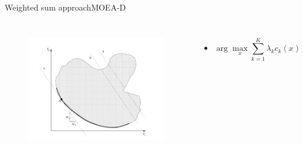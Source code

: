 \begin{frame}{Weighted sum approach}{MOEA-D}
	\begin{columns}
		\begin{figure}
			\centering
			\includegraphics[width=\linewidth]{figure/weighted_sum}
			\label{fig:weighted_sum}
		\end{figure}
		\begin{minipage}{\textwidth}
			\begin{itemize} %
				\item \begin{equation}
				\nonumber
				\arg\max_x \sum_{k=1}^{K} \lambda_{k} c_{k} (x)
				\end{equation}
			\end{itemize}
		\end{minipage}
	\end{columns}
\end{frame}

